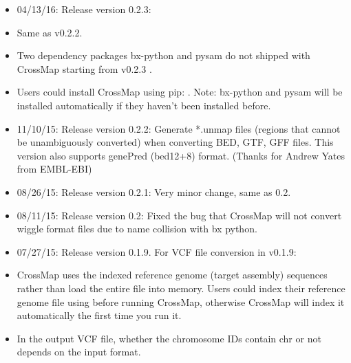 \documentclass[letterpaper,10pt,english]{sphinxmanual}
\begin{document}
\begin{itemize}
\item {} 
04/13/16: Release version 0.2.3:

\end{itemize}
\begin{itemize}
\item {} 
Same as v0.2.2.

\item {} 
Two dependency packages bx-python and pysam do not shipped with CrossMap starting from v0.2.3 .

\item {} 
Users could install CrossMap using pip: . Note: bx-python and pysam will be installed automatically if they haven’t been installed before.

\end{itemize}
\begin{itemize}
\item {} 
11/10/15: Release version 0.2.2: Generate *.unmap files (regions that cannot be unambiguously converted) when converting BED, GTF, GFF files. This version also supports genePred (bed12+8) format. (Thanks for Andrew Yates from EMBL-EBI)

\item {} 
08/26/15: Release version 0.2.1: Very minor change, same as 0.2.

\item {} 
08/11/15: Release version 0.2: Fixed the bug that CrossMap will not convert wiggle format files due to name collision with bx python.

\item {} 
07/27/15: Release version 0.1.9. For VCF file conversion in v0.1.9:

\end{itemize}
\begin{itemize}
\item {} 
CrossMap uses the indexed reference genome (target assembly) sequences rather than load the entire file into memory. Users could index their reference genome file using  before running CrossMap, otherwise CrossMap will index it automatically the first time you run it.

\item {} 
In the output VCF file, whether the chromosome IDs contain \sphinxquotedblleft{}chr\sphinxquotedblright{} or not depends on the input format.

\end{itemize}
\end{document}
